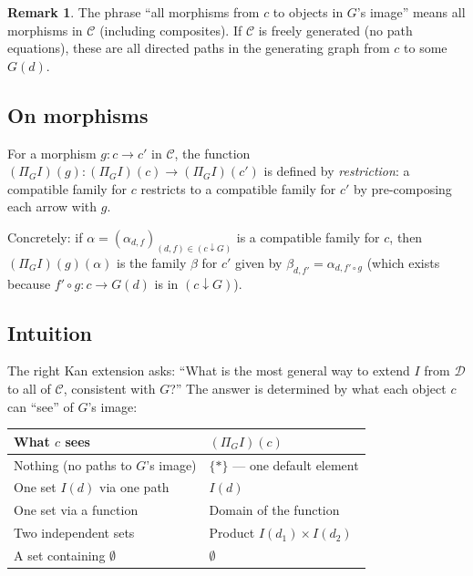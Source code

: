\documentclass[11pt,a4paper]{article}
\theoremstyle{definition}
\newtheorem{remark}{Remark}[section]
\theoremstyle{plain}
\begin{document}
\begin{remark}
The phrase ``all morphisms from $c$ to objects in $G$'s image'' means all morphisms in $\mathcal{C}$ (including composites). If $\mathcal{C}$ is freely generated (no path equations), these are all directed paths in the generating graph from $c$ to some $G(d)$.
\end{remark}

\subsection{On morphisms}

For a morphism $g \colon c \to c'$ in $\mathcal{C}$, the function $(\Pi_G I)(g) \colon (\Pi_G I)(c) \to (\Pi_G I)(c')$ is defined by \emph{restriction}: a compatible family for $c$ restricts to a compatible family for $c'$ by pre-composing each arrow with $g$.

Concretely: if $\alpha = (\alpha_{d,f})_{(d,f) \in (c \downarrow G)}$ is a compatible family for $c$, then $(\Pi_G I)(g)(\alpha)$ is the family $\beta$ for $c'$ given by $\beta_{d, f'} = \alpha_{d, f' \circ g}$ (which exists because $f' \circ g \colon c \to G(d)$ is in $(c \downarrow G)$).

\subsection{Intuition}

The right Kan extension asks: ``What is the most general way to extend $I$ from $\mathcal{D}$ to all of $\mathcal{C}$, consistent with $G$?'' The answer is determined by what each object $c$ can ``see'' of $G$'s image:

\begin{center}
\begin{tabular}{ll}
\toprule
\textbf{What $c$ sees} & \textbf{$(\Pi_G I)(c)$} \\
\midrule
Nothing (no paths to $G$'s image) & $\{*\}$ --- one default element \\
One set $I(d)$ via one path & $I(d)$ \\
One set via a function & Domain of the function \\
Two independent sets & Product $I(d_1) \times I(d_2)$ \\
A set containing $\emptyset$ & $\emptyset$ \\
\bottomrule
\end{tabular}
\end{center}
\end{document}
